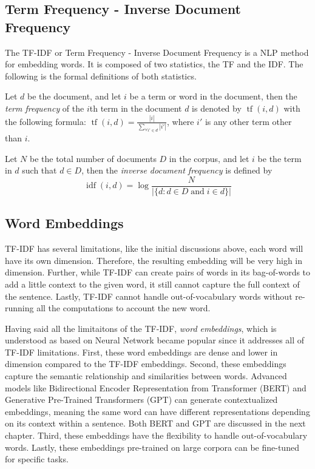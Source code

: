 \subsection{Term Frequency - Inverse Document Frequency}
The TF-IDF or Term Frequency - Inverse Document Frequency is a NLP method for embedding words. It is composed of two statistics, the TF and the IDF. The following is the formal definitions of both statistics.
\begin{defnx}
Let $d$ be the document, and let $i$ be a term or word in the document, then the \textit{term frequency} of the $i$th term in the document $d$ is denoted by $\operatorname{tf}(i,d)$ with the following formula: $\operatorname{tf}(i,d)=\displaystyle\frac{|i|}{\sum_{\forall i'\in d}|i'|}$, where $i'$ is any other term other than $i$.
\end{defnx}
\begin{defnx}
Let $N$ be the total number of documents $D$ in the corpus, and let $i$ be the term in $d$ such that $d\in D$, then the \textit{inverse document frequency} is defined by
\begin{equation}
    \operatorname{idf}(i,d)=\log\frac{N}{|\{d:d\in D\;\text{and}\;i\in d\}|}
\end{equation}
\end{defnx}
\subsection{Word Embeddings}\label{sec:word-embeddings}
TF-IDF has several limitations, like the initial discussions above, each word will have its own dimension. Therefore, the resulting embedding will be very high in dimension. Further, while TF-IDF can create pairs of words in its bag-of-words to add a little context to the given word, it still cannot capture the full context of the sentence. Lastly, TF-IDF cannot handle out-of-vocabulary words without re-running all the computations to account the new word.

Having said all the limitaitons of the TF-IDF, \textit{word embeddings}, which is understood as based on Neural Network became popular since it addresses all of TF-IDF limitations. First, these word embeddings are dense and lower in dimension compared to the TF-IDF embeddings. Second, these embeddings capture the semantic relationship and similarities between words. Advanced models like Bidirectional Encoder Representation from Transformer (BERT) and Generative Pre-Trained Transformers (GPT) can generate contextualized embeddings, meaning the same word can have different representations depending on its context within a sentence. Both BERT and GPT are discussed in the next chapter. Third, these embeddings have the flexibility to handle out-of-vocabulary words. Lastly, these embeddings pre-trained on large corpora can be fine-tuned for specific tasks.


